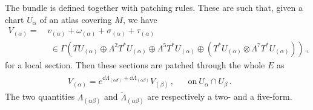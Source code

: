 \documentclass[debug]{phd}
\begin{document}
						The bundle is defined together with patching rules. 
						These are such that, given a chart $U_\alpha$ of an atlas covering $M$, we have
								\begin{equation}
									\begin{split}
										V_{(\alpha)} = &\, v_{(\alpha)} + \omega_{(\alpha)} + \sigma_{(\alpha)} + \tau_{(\alpha)} \\[1mm]
												&\phantom{v} \in \Gamma\left( TU_{(\alpha)} \oplus \Lambda^2 T^*U_{(\alpha)} \oplus \Lambda^5 T^*U_{(\alpha)} \oplus (T^*U_{(\alpha)} \otimes \Lambda^7 T^*U_{(\alpha)}) \right) \, ,
									\end{split}
								\end{equation}
						for a local section.
						Then these sections are patched through the whole $E$ as
								\begin{align}\label{Vpatch}
									& & V_{(\alpha)} = e^{\dd \Lambda_{(\alpha \beta)} + \dd \tilde{\Lambda}_{(\alpha \beta)}} V_{(\beta)} \, , & & \mbox{on}\ U_\alpha \cap U_\beta \, . \phantom{U_\alpha \cap U_\beta}
								\end{align}
						The two quantities $\Lambda_{(\alpha \beta)}$ and $\tilde{\Lambda}_{(\alpha \beta)}$ are respectively a two- and a five-form.
						
\end{document}

